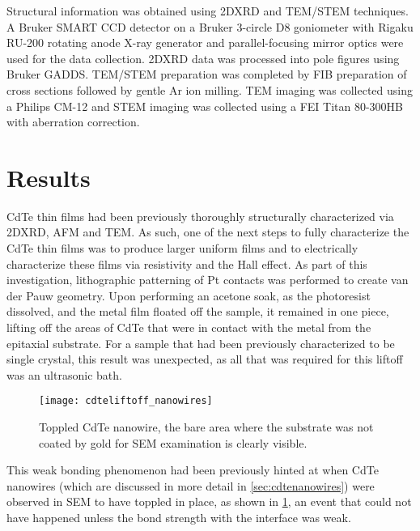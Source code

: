 Structural information was obtained using 2DXRD and TEM/STEM techniques.
A Bru\-ker SMART CCD detector on a Bruker 3-circle D8 goniometer with Rigaku RU-200 rotating anode X-ray generator and parallel-focusing mirror optics were used for the data collection.
2DXRD data was processed into pole figures using Bruker GADDS\@.
TEM/STEM preparation was completed by FIB preparation of cross sections followed by gentle Ar ion milling.
TEM imaging was collected using a Philips CM-12 and STEM imaging was collected using a FEI Titan 80-300HB with aberration correction.
\section{Results}
CdTe thin films had been previously thoroughly structurally characterized via 2DXRD, AFM and TEM\@. As such, one of the next steps to fully characterize the CdTe thin films was to produce larger uniform films\cite{stephen-thesis} and to electrically characterize these films via resistivity and the Hall effect.
As part of this investigation, lithographic patterning of Pt contacts was performed to create van der Pauw geometry.
Upon performing an acetone soak, as the photoresist dissolved, and the metal film floated off the sample, it remained in one piece, lifting off the areas of CdTe that were in contact with the metal from the epitaxial substrate.
For a sample that had been previously characterized to be single crystal, this result was unexpected, as all that was required for this liftoff was an ultrasonic bath.
\begin{figure}
 \centering \texttt{[image: cdteliftoff\_nanowires]}
 \caption[Toppled CdTe nanowire]{\label{fig:cdteliftoff_nanowires}Toppled CdTe nanowire, the bare area where the substrate was not coated by gold for SEM examination is clearly visible.}
\end{figure}
This weak bonding phenomenon had been previously hinted at when CdTe nanowires (which are discussed in more detail in \cref{sec:cdtenanowires}) were observed in SEM to have toppled in place, as shown in \cref{fig:cdteliftoff_nanowires}, an event that could not have happened unless the bond strength with the interface was weak.

